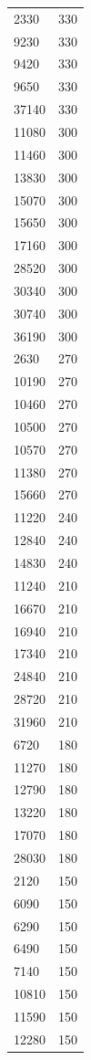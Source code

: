 \begin{table}[ht]
\begin{tabular}{lr}
  2330 & 330 \\ 
  9230 & 330 \\ 
  9420 & 330 \\ 
  9650 & 330 \\ 
  37140 & 330 \\ 
  11080 & 300 \\ 
  11460 & 300 \\ 
  13830 & 300 \\ 
  15070 & 300 \\ 
  15650 & 300 \\ 
  17160 & 300 \\ 
  28520 & 300 \\ 
  30340 & 300 \\ 
  30740 & 300 \\ 
  36190 & 300 \\ 
  2630 & 270 \\ 
  10190 & 270 \\ 
  10460 & 270 \\ 
  10500 & 270 \\ 
  10570 & 270 \\ 
  11380 & 270 \\ 
  15660 & 270 \\ 
  11220 & 240 \\ 
  12840 & 240 \\ 
  14830 & 240 \\ 
  11240 & 210 \\ 
  16670 & 210 \\ 
  16940 & 210 \\ 
  17340 & 210 \\ 
  24840 & 210 \\ 
  28720 & 210 \\ 
  31960 & 210 \\ 
  6720 & 180 \\ 
  11270 & 180 \\ 
  12790 & 180 \\ 
  13220 & 180 \\ 
  17070 & 180 \\ 
  28030 & 180 \\ 
  2120 & 150 \\ 
  6090 & 150 \\ 
  6290 & 150 \\ 
  6490 & 150 \\ 
  7140 & 150 \\ 
  10810 & 150 \\ 
  11590 & 150 \\ 
  12280 & 150 \\ 

\end{tabular}
\end{table}

